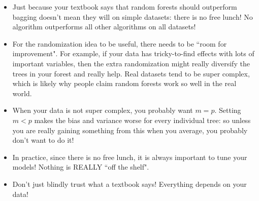 \begin{itemize}
\item Just because your textbook says that random forests should outperform bagging doesn't mean they will on simple datasets: there is no free lunch! No algorithm outperforms all other algorithms on all datasets! 
\item For the randomization idea to be useful, there needs to be ``room for improvement". For example, if your data has tricky-to-find effects with lots of important variables, then the extra randomization might really diversify the trees in your forest and really help. Real datasets tend to be super complex, which is likely why people claim random forests work so well in the real world. 
\item When your data is not super complex, you probably want $m=p$. Setting $m < p$ makes the bias and variance worse for every individual tree: so unless you are really gaining something from this when you average, you probably don't want to do it!
\item In practice, since there is no free lunch, it is always important to tune your models! Nothing is REALLY ``off the shelf". 
\item Don't just blindly trust what a textbook says! Everything depends on your data!
\end{itemize}






